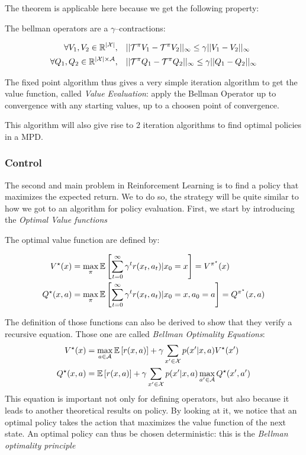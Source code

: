 The theorem is applicable here because we get the following property:

\begin{proposition}
    The bellman operators are a $\gamma$--contractions:

    \begin{align*}
        \forall V_1, V_2 \in \mathbb{R}^{|\mathcal{X}|}, \quad &|| \mathcal{T}^\pi V_1 - \mathcal{T}^\pi V_2 ||_\infty \leq \gamma ||  V_1 - V_2 ||_\infty\\
        \forall Q_1, Q_2 \in \mathbb{R}^{|\mathcal{X}|\times \mathcal{A}}, \quad &|| \mathcal{T}^\pi Q_1 - \mathcal{T}^\pi Q_2 ||_\infty \leq \gamma ||  Q_1 - Q_2 ||_\infty
    \end{align*}
\end{proposition}

The fixed point algorithm thus gives a very simple iteration algorithm to get the value function, called \emph{Value Evaluation}: apply the Bellman Operator up to convergence with any starting values, up to a choosen point of convergence.

This algorithm will also give rise to 2 iteration algorithms to find optimal policies in a MPD.

\subsubsection*{Control} 

The second and main problem in Reinforcement Learning is to find a policy that maximizes the expected return. We to do so, the strategy will be quite similar to how we got to an algorithm for policy evaluation. First, we start by introducing the \emph{Optimal Value functions}

\begin{definition}
    The optimal value function are defined by:

\begin{align*}
V^{\star}(x) &= \max_{\pi} \mathbb{E}\left[ \sum_{t=0}^\infty  \gamma^t r(x_t, a_t) | x_0 = x \right] = V^{\pi^{\star}}(x)\\
Q^{\star}(x,a) &= \max_{\pi} \mathbb{E}\left[ \sum_{t=0}^\infty  \gamma^t r(x_t, a_t) | x_0 = x, a_0 = a \right] = Q^{\pi^{\star}} (x,a)
\end{align*}
\end{definition}

The definition of those functions can also be derived to show that they verify a recursive equation. Those one are called \emph{Bellman Optimality Equations}:
\begin{align*}
V^{\star}(x) & = \max_{a \in \mathcal{A}} \mathbb{E}\left[ r(x,a) \right] + \gamma \sum_{x^\prime  \in \mathcal{X}} p(x^\prime |x,a)V^{\star}(x^\prime ) \\
Q^{\star}(x,a) & = \mathbb{E}\left[ r(x,a) \right] + \gamma \sum_{x^\prime  \in \mathcal{X}} p(x^\prime |x,a)\max_{a^\prime  \in \mathcal{A}}Q^{\star}(x^\prime ,a^\prime )
\end{align*}
This equation is important not only for defining operators, but also because it leads to another theoretical results on policy. By looking at it, we notice that an optimal policy takes the action that maximizes the value function of the next state. An optimal policy can thus be chosen deterministic: this is the \emph{Bellman optimality principle}

